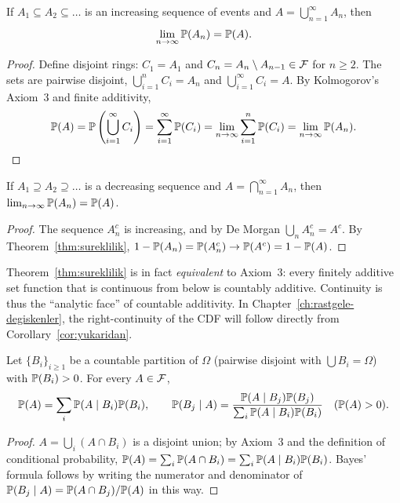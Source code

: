 \documentclass[main.tex]{subfiles}
\begin{document}
\begin{theorem}\label{thm:sureklilik}
If $A_1 \subseteq A_2 \subseteq \dots$ is an increasing sequence of events and $A = \bigcup_{n=1}^\infty A_n$, then
\[
\lim_{n \to \infty} \P(A_n) = \P(A).
\]
\end{theorem}
\begin{proof}
Define disjoint rings: $C_1 = A_1$ and $C_n = A_n \setminus A_{n-1} \in \F$ for $n \ge 2$. The sets are pairwise disjoint, $\bigcup_{i=1}^n C_i = A_n$ and $\bigcup_{i=1}^\infty C_i = A$. By Kolmogorov's Axiom~3 and finite additivity,
\[
\P(A) = \P\left(\bigcup_{i=1}^\infty C_i\right) = \sum_{i=1}^\infty \P(C_i) = \lim_{n \to \infty} \sum_{i=1}^n \P(C_i) = \lim_{n \to \infty} \P(A_n). \qedhere
\]
\end{proof}

\begin{corollary}\label{cor:yukaridan}
If $A_1\supseteq A_2\supseteq\dots$ is a decreasing sequence and $A=\bigcap_{n=1}^\infty A_n$, then $\lim_{n\to\infty}\P(A_n)=\P(A)$.
\end{corollary}
\begin{proof}
The sequence $A_n^c$ is increasing, and by De Morgan $\bigcup_n A_n^c = A^c$. By Theorem~\ref{thm:sureklilik}, $1-\P(A_n)=\P(A_n^c)\to\P(A^c)=1-\P(A)$.
\end{proof}

\begin{remark}
Theorem~\ref{thm:sureklilik} is in fact \emph{equivalent} to Axiom~3: every finitely additive set function that is continuous from below is countably additive. Continuity is thus the ``analytic face'' of countable additivity. In Chapter~\ref{ch:rastgele-degiskenler}, the right-continuity of the CDF will follow directly from Corollary~\ref{cor:yukaridan}.
\end{remark}

\begin{theorem}\label{thm:bayes}
Let $\{B_i\}_{i\ge1}$ be a countable partition of $\Omega$ (pairwise disjoint with $\bigcup B_i=\Omega$) with $\P(B_i)>0$. For every $A\in\F$,
\[
\P(A)=\sum_{i}\P(A\mid B_i)\P(B_i),
\qquad
\P(B_j\mid A)=\frac{\P(A\mid B_j)\P(B_j)}{\sum_i \P(A\mid B_i)\P(B_i)}\quad(\P(A)>0).
\]
\end{theorem}
\begin{proof}
$A=\bigcup_i (A\cap B_i)$ is a disjoint union; by Axiom~3 and the definition of conditional probability, $\P(A)=\sum_i\P(A\cap B_i)=\sum_i\P(A\mid B_i)\P(B_i)$. Bayes' formula follows by writing the numerator and denominator of $\P(B_j\mid A)=\P(A\cap B_j)/\P(A)$ in this way.
\end{proof}
\end{document}
